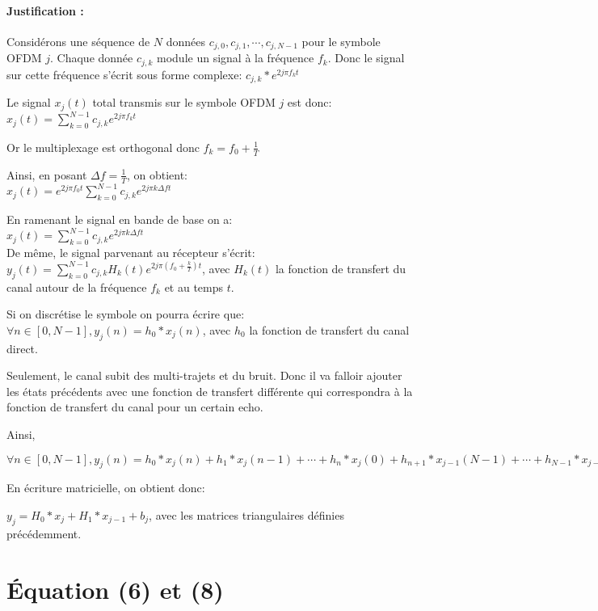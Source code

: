 \paragraph{Justification :}

Considérons une séquence de $N$ données $c_{j,0},c_{j,1},\cdots,c_{j,N-1}$ pour le symbole
OFDM $j$. Chaque donnée $c_{j,k}$ module un signal à la fréquence $f_k$. Donc le
signal sur cette fréquence s'écrit sous forme complexe: $c_{j,k}*e^{2j\pi f_kt}$

Le signal $x_j(t)$ total transmis sur le symbole OFDM $j$ est donc: \\
$x_j(t)=\sum_{k=0}^{N-1}c_{j,k}e^{2j\pi f_kt}$

Or le multiplexage est orthogonal donc $f_k=f_0+\frac{1}{T}$

Ainsi, en posant $\Delta f = \frac{1}{T}$, on obtient: \\
$x_j(t)=e^{2j\pi f_0t}\sum_{k=0}^{N-1}c_{j,k}e^{2j\pi k\Delta ft}$

En ramenant le signal en bande de base on a:\\
$x_j(t)=\sum_{k=0}^{N-1}c_{j,k}e^{2j\pi k\Delta ft}$
~\\

De même, le signal parvenant au récepteur s'écrit:\\
$y_j(t)=\sum_{k=0}^{N-1}c_{j,k}H_k(t)e^{2j\pi (f_0+\frac{k}{T})t}$, avec $H_k(t)$ la
fonction de transfert du canal autour de la fréquence $f_k$ et au temps $t$.

Si on discrétise le symbole on pourra écrire que: \\
$\forall n \in [0,N-1], y_j(n) = h_0*x_j(n)$, avec $h_0$ la fonction de
transfert du canal direct.

Seulement, le canal subit des multi-trajets et du bruit. Donc il va falloir
ajouter les états précédents avec une fonction de transfert différente qui
correspondra à la fonction de transfert du canal pour un certain echo.

Ainsi,

$\forall n \in [0,N-1], y_j(n) = h_0*x_j(n) + h_1*x_j(n-1) + \cdots
+h_{n}*x_j(0) + h_{n+1}*x_{j-1}(N-1) + \cdots + h_{N-1}*x_{j-1}(n+1) + b_j$

En écriture matricielle, on obtient donc:

$ y_j = H_0*x_j+H_1*x_{j-1}+b_j$, avec les matrices triangulaires définies précédemment.

\section{Équation (6) et (8)}

